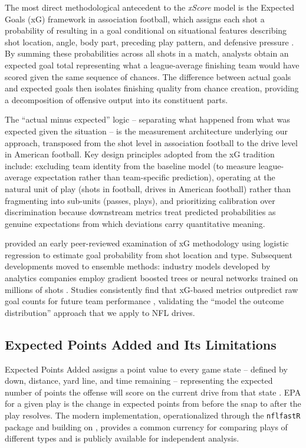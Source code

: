 \documentclass[12pt,a4paper]{article}
\newcommand{\xscore}{\textit{xScore}}
\begin{document}
The most direct methodological antecedent to the \xscore{} model is the Expected Goals (xG) framework in association football, which assigns each shot a probability of resulting in a goal conditional on situational features describing shot location, angle, body part, preceding play pattern, and defensive pressure \citep{eggels2016expected}. By summing these probabilities across all shots in a match, analysts obtain an expected goal total representing what a league-average finishing team would have scored given the same sequence of chances. The difference between actual goals and expected goals then isolates finishing quality from chance creation, providing a decomposition of offensive output into its constituent parts.

The ``actual minus expected'' logic -- separating what happened from what was expected given the situation -- is the measurement architecture underlying our approach, transposed from the shot level in association football to the drive level in American football. Key design principles adopted from the xG tradition include: excluding team identity from the baseline model (to measure league-average expectation rather than team-specific prediction), operating at the natural unit of play (shots in football, drives in American football) rather than fragmenting into sub-units (passes, plays), and prioritizing calibration over discrimination because downstream metrics treat predicted probabilities as genuine expectations from which deviations carry quantitative meaning.

\citet{rathke2017expectedgoals} provided an early peer-reviewed examination of xG methodology using logistic regression to estimate goal probability from shot location and type. Subsequent developments moved to ensemble methods: industry models developed by analytics companies employ gradient boosted trees or neural networks trained on millions of shots \citep{statsbomb2019opendata}. Studies consistently find that xG-based metrics outpredict raw goal counts for future team performance \citep{rathke2017expectedgoals, anzer2021goal}, validating the ``model the outcome distribution'' approach that we apply to NFL drives.

\subsection{Expected Points Added and Its Limitations}

Expected Points Added assigns a point value to every game state -- defined by down, distance, yard line, and time remaining -- representing the expected number of points the offense will score on the current drive from that state \citep{carter1971operations}. EPA for a given play is the change in expected points from before the snap to after the play resolves. The modern implementation, operationalized through the \texttt{nflfastR} package \citep{carl2021nflfastr} and building on \citet{yurko2019nflwar}, provides a common currency for comparing plays of different types and is publicly available for independent analysis.
\end{document}
